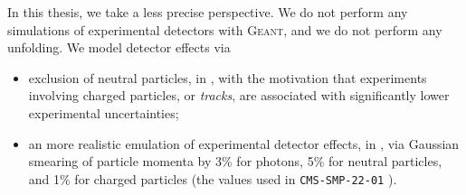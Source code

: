 \begin{subappendices}
In this thesis, we take a less precise perspective.
%
We do not perform any simulations of experimental detectors with \textsc{Geant}, and we do not perform any unfolding.
%
We model detector effects via
\begin{itemize}
    \item
        exclusion of neutral particles, in , with the motivation that experiments involving charged particles, or \textit{tracks}, are associated with significantly lower experimental uncertainties;

    \item
    an more realistic emulation of experimental detector effects, in , via Gaussian smearing of particle momenta by 3\% for photons, 5\% for neutral particles, and 1\% for charged particles (the values used in \texttt{CMS-SMP-22-01} \cite{CMS:2024mlf}).
\end{itemize}



\end{subappendices}
